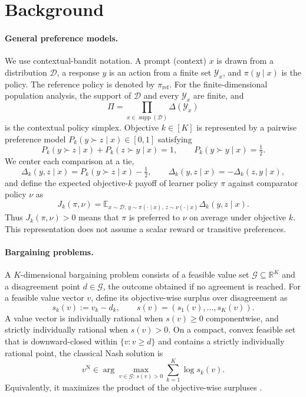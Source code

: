 \documentclass{article}
\theoremstyle{remark}
\theoremstyle{plain}
\newcommand{\Y}{\mathcal{Y}}
\newcommand{\G}{\mathcal{G}}
\newcommand{\E}{\mathbb{E}}
\newcommand{\R}{\mathbb{R}}
\newcommand{\D}{\mathcal{D}}
\newcommand{\piref}{\pi_{\mathrm{ref}}}
\begin{document}
\section{Background}
\label{sec:background}
\paragraph{General preference models.}
We use contextual-bandit notation. A prompt (context) $x$ is drawn from a distribution $\D$, a response $y$ is an action from a finite set $\Y_x$, and $\pi(y\mid x)$ is the policy. The reference policy is denoted by $\piref$. For the finite-dimensional population analysis, the support of $\D$ and every $\Y_x$ are finite, and
\[
\Pi=\prod_{x\in\operatorname{supp}(\D)}\Delta(\Y_x)
\]
is the contextual policy simplex. Objective $k\in[K]$ is represented by a pairwise preference model $P_k(y\succ z\mid x)\in[0,1]$ satisfying
\begin{equation}
P_k(y\succ z\mid x)+P_k(z\succ y\mid x)=1,
\qquad
P_k(y\succ y\mid x)=\tfrac12.
\label{eq:skew}
\end{equation}
We center each comparison at a tie,
\begin{equation}
\Delta_k(y,z\mid x)
=
P_k(y\succ z\mid x)-\tfrac12,
\qquad
\Delta_k(y,z\mid x)=-\Delta_k(z,y\mid x),
\label{eq:centered}
\end{equation}
and define the expected objective-$k$ payoff of learner policy $\pi$ against comparator policy $\nu$ as
\begin{equation}
J_k(\pi,\nu)
=
\E_{x\sim\D,\,y\sim\pi(\cdot\mid x),\,z\sim\nu(\cdot\mid x)}
\Delta_k(y,z\mid x).
\label{eq:game-payoff}
\end{equation}
Thus $J_k(\pi,\nu)>0$ means that $\pi$ is preferred to $\nu$ on average under objective $k$. This representation does not assume a scalar reward or transitive preferences.

\paragraph{Bargaining problems.}
A $K$-dimensional bargaining problem consists of a feasible value set $\G\subseteq\R^K$ and a disagreement point $d\in\G$, the outcome obtained if no agreement is reached. For a feasible value vector $v$, define its objective-wise surplus over disagreement as
\begin{equation}
s_k(v):=v_k-d_k,
\qquad
s(v)=(s_1(v),\ldots,s_K(v)).
\label{eq:classical-surplus}
\end{equation}
A value vector is individually rational when $s(v)\ge0$ componentwise, and strictly individually rational when $s(v)>0$. On a compact, convex feasible set that is downward-closed within $\{v:v\ge d\}$ and contains a strictly individually rational point, the classical Nash solution is
\begin{equation}
v^{\mathrm N}
\in
\arg\max_{v\in\G:\,s(v)>0}
\sum_{k=1}^K\log s_k(v).
\label{eq:classical-nash}
\end{equation}
Equivalently, it maximizes the product of the objective-wise surpluses \citep{nash1950}.
\end{document}
